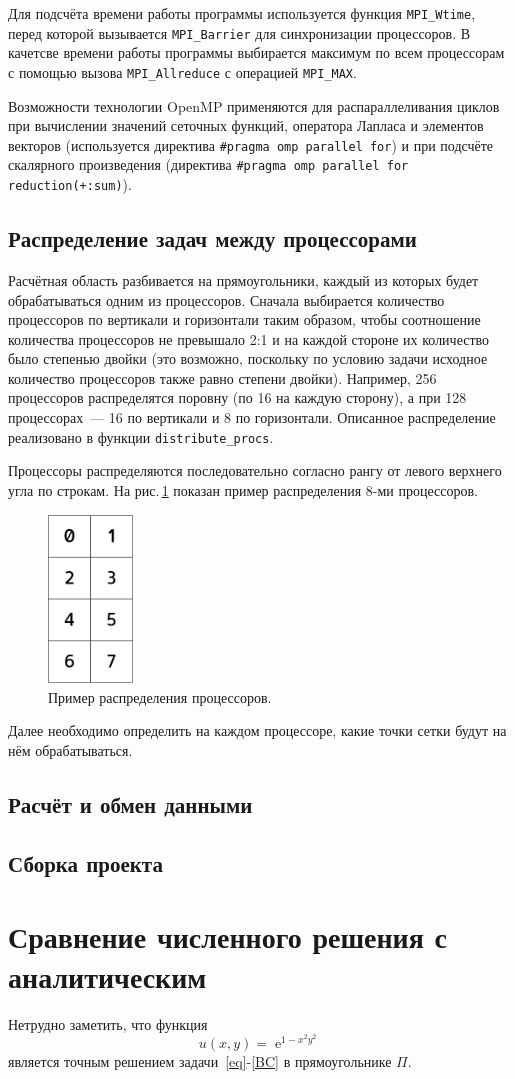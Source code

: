 \documentclass[11pt]{article}
\numberwithin{equation}{section}
\theoremstyle{plain}
\theoremstyle{definition}
\DeclareMathOperator{\expon}{e}
\begin{document}
Для подсчёта времени работы программы используется функция \verb|MPI_Wtime|,
перед которой вызывается \verb|MPI_Barrier| для синхронизации процессоров.
В качетсве времени работы программы выбирается максимум по всем процессорам
с помощью вызова \verb|MPI_Allreduce| с операцией \verb|MPI_MAX|.

Возможности технологии OpenMP применяются для распараллеливания циклов
при вычислении значений сеточных функций, оператора Лапласа и элементов
векторов (используется директива
\verb|#pragma omp parallel for|) и при подсчёте скалярного произведения
(директива \verb|#pragma omp parallel for reduction(+:sum)|).

\subsection{Распределение задач между процессорами}
Расчётная область разбивается на прямоугольники, каждый из которых будет
обрабатываться одним из процессоров. Сначала выбирается количество
процессоров по вертикали и горизонтали таким образом, чтобы соотношение
количества процессоров не превышало 2:1 и на каждой стороне их количество
было степенью двойки (это возможно, поскольку по условию задачи исходное
количество процессоров также равно степени двойки). Например, 256 процессоров
распределятся поровну (по 16 на каждую сторону), а при 128 процессорах~---
16 по вертикали и 8 по горизонтали.
Описанное распределение реализовано в функции \verb|distribute_procs|.

Процессоры распределяются последовательно согласно рангу от левого верхнего угла
по строкам. На рис.\,\ref{distr_procs} показан пример распределения 8-ми
процессоров.

\begin{figure}[ht]
    \centering
    \includegraphics[width=0.2\textwidth]{proc_distr.png}
    \caption{Пример распределения процессоров.}
    \label{distr_procs}
\end{figure}

Далее необходимо определить на каждом процессоре, какие точки сетки будут на
нём обрабатываться.

\subsection{Расчёт и обмен данными}
\subsection{Сборка проекта}

\section{Сравнение численного решения с аналитическим}
Нетрудно заметить, что функция
\[u(x,y)=\expon^{1-x^2y^2}\]
является точным решением задачи~\eqref{eq}-\eqref{BC} в прямоугольнике \(\Pi.\)
\end{document}
